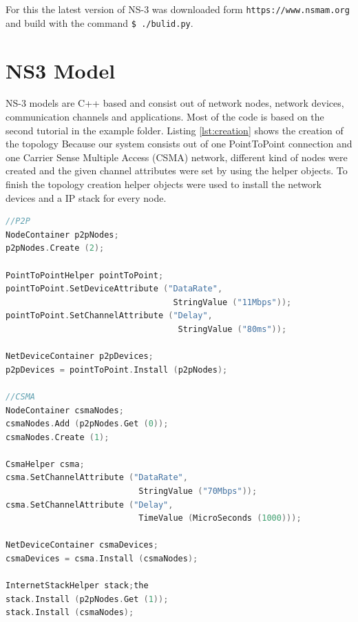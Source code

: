 \documentclass[parskip=full]{scrartcl}
\begin{document}
For this the latest version of NS-3 was downloaded form \verb|https://www.nsmam.org| and build with the command \verb|$ ./bulid.py|. 


\section{NS3 Model} \label{sec:procedure}
NS-3 models are C++ based and consist out of network nodes, network devices, communication channels and applications.
Most of the code is based on the second tutorial in the example folder.
Listing \ref{lst:creation} shows the creation of the topology
Because our system consists out of one PointToPoint connection and one Carrier Sense Multiple Access (CSMA) network, different kind of nodes were created and the given channel attributes were set by using the helper objects.
To finish the topology creation helper objects were used to install the network devices and a IP stack for every node.

\begin{lstlisting}[language=c++, frame=single, captionpos=b, caption={Topology creation}, label=lst:creation]
//P2P
NodeContainer p2pNodes;
p2pNodes.Create (2);

PointToPointHelper pointToPoint;
pointToPoint.SetDeviceAttribute ("DataRate", 
                                  StringValue ("11Mbps"));
pointToPoint.SetChannelAttribute ("Delay", 
                                   StringValue ("80ms"));
                                   
NetDeviceContainer p2pDevices;
p2pDevices = pointToPoint.Install (p2pNodes);

//CSMA
NodeContainer csmaNodes;
csmaNodes.Add (p2pNodes.Get (0));
csmaNodes.Create (1);

CsmaHelper csma;
csma.SetChannelAttribute ("DataRate", 
                           StringValue ("70Mbps"));
csma.SetChannelAttribute ("Delay", 
                           TimeValue (MicroSeconds (1000)));
                           
NetDeviceContainer csmaDevices;
csmaDevices = csma.Install (csmaNodes);

InternetStackHelper stack;the
stack.Install (p2pNodes.Get (1));
stack.Install (csmaNodes);
\end{lstlisting}
\end{document}
